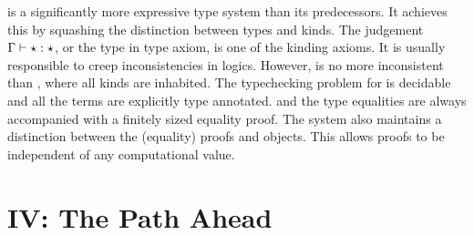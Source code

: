 \documentclass[screen,nonacm,manuscript,review]{acmart} %
\begin{document}
\SFK is a significantly more expressive type system than its predecessors. It achieves this by squashing
the distinction between types and kinds. The judgement $\Gamma \vdash \star : \star$,
or the type in type axiom, is one of the kinding axioms.
It is usually responsible to creep inconsistencies in logics.
However, \SFK is no more inconsistent than \SFC, where all kinds are inhabited.
The typechecking problem for \SFK is decidable and all the terms are explicitly type annotated.
and the type equalities are always accompanied with a finitely sized equality proof.
The system also maintains a distinction between the (equality)
proofs and objects. This allows proofs to be independent of any computational value.

\part{IV: The Path Ahead}\label{part:IV}
\end{document}
